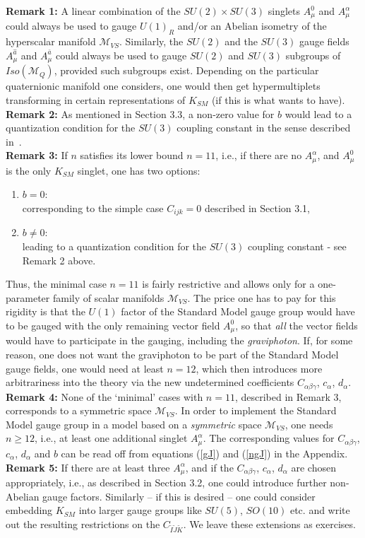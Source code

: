 \documentclass[a4paper,11pt]{article}
\newcommand{\ti}{\ensuremath{\tilde{I}}}
\newcommand{\tj}{\ensuremath{\tilde{J}}}
\newcommand{\tk}{\ensuremath{\tilde{K}}}
\newcommand{\M}{\ensuremath{\mathcal{M}}}
\begin{document}
\noindent\textbf{Remark 1:} A linear combination of the $SU(2)\times SU(3)$ 
singlets $A_{\mu}^{0}$ and 
$A_{\mu}^{\alpha}$ could always be used to gauge $U(1)_{R}$ and/or
an Abelian isometry of the hyperscalar manifold $\M_{VS}$.
Similarly, the $SU(2)$ and the $SU(3)$ gauge fields $A_{\mu}^{\hat{a}}$
and $A_{\mu}^{\bar{a}}$ could always be used to gauge $SU(2)$ and $SU(3)$
subgroups of $Iso(\M_{Q})$, provided such subgroups exist. Depending on 
the particular quaternionic manifold one considers, one would then 
get hypermultiplets transforming in certain representations of
$K_{SM}$ (if this is what wants to have).\\
\textbf{Remark 2:} As mentioned in Section 3.3, a non-zero value 
for $b$ would lead to a 
quantization condition for the $SU(3)$ coupling constant in the sense 
described in~\cite{GST1.5}.\\
\textbf{Remark 3:} If $n$ satisfies its lower bound $n=11$, i.e.,
if there are no $A_{\mu}^{\alpha}$, and $A_{\mu}^{0}$ is the only 
$K_{SM}$ singlet, one has two options:
\begin{enumerate}
\item $b=0$:\\
corresponding to the simple case $C_{ijk}=0$ described in
Section 3.1,
\item $b\neq 0$:\\
leading to a quantization condition for the $SU(3)$ coupling
constant - see Remark 2 above.
\end{enumerate}
Thus, the minimal case $n=11$ is fairly restrictive and allows only for  
a one-parameter family of scalar manifolds $\M_{VS}$. 
The price one has to pay for this rigidity
is that the $U(1)$ factor of the Standard Model gauge group 
would have to be gauged with the only remaining vector field $A_{\mu}^{0}$,
so that \emph{all} the vector fields would have to participate in the 
gauging, including the \emph{graviphoton}. If, for some reason, 
one does not want the graviphoton to be part of the Standard Model
gauge fields, one would need at least
$n=12$, which then introduces more arbitrariness into the theory
via the new undetermined coefficients $C_{\alpha\beta\gamma}$, 
$c_{\alpha}$, $d_{\alpha}$.\\
\textbf{Remark 4:}
None of the `minimal' cases with $n=11$, described in Remark 3,
corresponds to a symmetric space $\M_{VS}$. 
In order to implement  the Standard Model 
gauge group in a model based on a \emph{symmetric} space $\M_{VS}$,
one needs $n\geq 12$, i.e., at least one additional singlet $A_{\mu}^{\alpha}$.
The corresponding values for $C_{\alpha\beta\gamma}$, 
$c_{\alpha}$, $d_{\alpha}$ and  $b$ can be read off from
equations (\ref{gJ}) and (\ref{ngJ})  in the Appendix.\\
\textbf{Remark 5:} If there are at least three $A_{\mu}^{\alpha}$,
and if the $C_{\alpha\beta\gamma}$, $c_{\alpha}$, $d_{\alpha}$ 
are chosen appropriately, i.e., 
as described in Section 3.2, one could introduce further non-Abelian 
gauge factors. Similarly -- if this is desired -- 
one could consider embedding $K_{SM}$
into larger gauge  groups like $SU(5)$, $SO(10)$ etc. 
and write out the resulting
restrictions on the $C_{\ti\tj\tk}$. We leave these extensions as
exercises.
\end{document}

